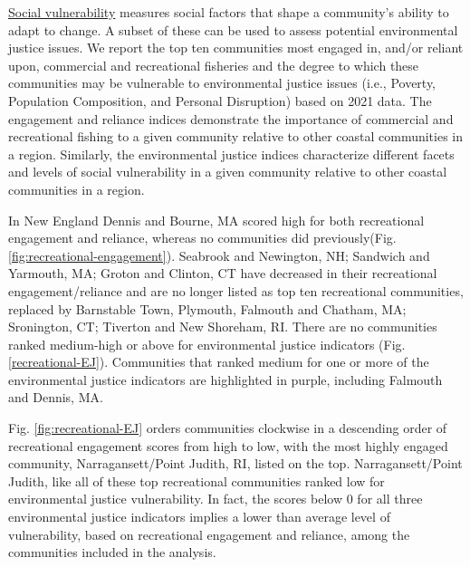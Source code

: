 \documentclass[
  10pt,
]{article}
\begin{document}
\href{https://noaa-edab.github.io/catalog/engagement-reliance-and-environmental-justice-in-top-fishing-communities.html}{Social vulnerability} measures social factors that shape a community's ability to adapt to change. A subset of these can be used to assess potential environmental justice issues. We report the top ten communities most engaged in, and/or reliant upon, commercial and recreational fisheries and the degree to which these communities may be vulnerable to environmental justice issues (i.e., Poverty, Population Composition, and Personal Disruption) based on 2021 data. The engagement and reliance indices demonstrate the importance of commercial and recreational fishing to a given community relative to other coastal communities in a region. Similarly, the environmental justice indices characterize different facets and levels of social vulnerability in a given community relative to other coastal communities in a region.

In New England Dennis and Bourne, MA scored high for both recreational engagement and reliance, whereas no communities did previously(Fig.\ref{fig:recreational-engagement}). Seabrook and Newington, NH; Sandwich and Yarmouth, MA; Groton and Clinton, CT have decreased in their recreational engagement/reliance and are no longer listed as top ten recreational communities, replaced by Barnstable Town, Plymouth, Falmouth and Chatham, MA; Sronington, CT; Tiverton and New Shoreham, RI. There are no communities ranked medium-high or above for environmental justice indicators (Fig. \ref{recreational-EJ}). Communities that ranked medium for one or more of the environmental justice indicators are highlighted in purple, including Falmouth and Dennis, MA.

Fig. \ref{fig:recreational-EJ} orders communities clockwise in a descending order of recreational engagement scores from high to low, with the most highly engaged community, Narragansett/Point Judith, RI, listed on the top. Narragansett/Point Judith, like all of these top recreational communities ranked low for environmental justice vulnerability. In fact, the scores below 0 for all three environmental justice indicators implies a lower than average level of vulnerability, based on recreational engagement and reliance, among the communities included in the analysis.
\end{document}
